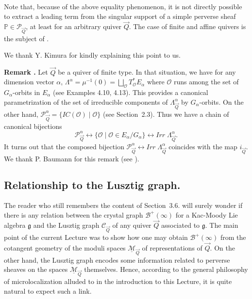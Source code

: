 \documentclass[a4paper,10pt]{amsart}
\def\g{\mathfrak{g}}
\def\PQ{\mathcal{P}_{\vec{Q}}}
\numberwithin{equation}{section}
\begin{document}
Note that, because of the above equality phenomenon, it is not directly possible to extract a leading term from the singular support of a simple perverse sheaf $\mathbb{P} \in \PQ$, at least for an arbitrary quiver $\vec{Q}$. The case of finite and affine quivers is the subject of \cite{KimuraNak}.

We thank Y. Kimura for kindly explaining this point to us.

\vspace{.2in}

\addtocounter{theo}{1}
\noindent \textbf{Remark \thetheo .} Let $\vec{Q}$ be a quiver of finite type. In that situation, we have for any dimension vector $\alpha$, $\Lambda^{\alpha}=\mu^{-1}(0)=\bigsqcup_{\mathcal{O}} T^*_{\mathcal{O}}E_{\alpha}$ where $\mathcal{O}$ runs among the set of $G_{\alpha}$-orbits in $E_{\alpha}$ (see Examples 4.10, 4.13). This provides a canonical parametrization of the set of irreducible components of $\Lambda^{\alpha}_{\vec{Q}}$ by $G_{\alpha}$-orbits.
On the other hand, $\mathcal{P}^{\alpha}_{\vec{Q}}=\{IC(\mathcal{O})\;|\; \mathcal{O}\}$ (see Section~2.3). Thus we have a chain of canonical bijections 
$$\mathcal{P}^{\alpha}_{\vec{Q}} \leftrightarrow \{\mathcal{O} \;|\; \mathcal{O} \in E_{\alpha}/G_{\alpha}\} \leftrightarrow Irr\;\Lambda^{\alpha}_{\vec{Q}}.$$ 
It turns out that the composed bijection $\mathcal{P}^{\alpha}_{\vec{Q}} \leftrightarrow Irr\;\Lambda^{\alpha}_{\vec{Q}}$ coincides with the map $i_{\vec{Q}}$. We thank P. Baumann for this remark (see \cite{Baumann}).

\vspace{.3in}

\subsection{Relationship to the Lusztig graph.}


\vspace{.15in}

The reader who still remembers the content of Section~3.6. will surely wonder if there is any relation between the crystal graph $\mathcal{B}^+(\infty)$ for a Kac-Moody Lie algebra $\g$ and the Lusztig graph $\mathcal{C}_{\vec{Q}}$ of any quiver $\vec{Q}$ associated to $\g$.  The main point of the current Lecture was to show how one may obtain $\mathcal{B}^+(\infty)$ from the cotangent geometry of the moduli spaces $\underline{\mathcal{M}}_{\vec{Q}}$ of representations of $\vec{Q}$. On the other hand, the Lusztig graph encodes some information related to perverse sheaves on the spaces $\underline{\mathcal{M}}_{\vec{Q}}$ themselves. Hence, according to the general philosophy of microlocalization alluded to in the introduction to this Lecture, it is quite natural to expect such a link. 
\end{document}
